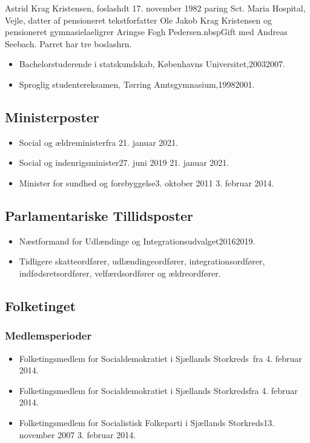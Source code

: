 \documentclass[11pt, a4paper]{awesome-cv}
\begin{document}
\makecvheader[R]
\makelettertitle
\begin{cvletter}
Astrid Krag Kristensen, foslashdt 17. november 1982 paring Sct. Maria Hospital, Vejle, datter af pensioneret tekstforfatter Ole Jakob Krag Kristensen og pensioneret gymnasielaeligrer Aringse Fogh Pedersen.nbspGift med Andreas Seebach. Parret har tre boslashrn.

\begin{itemize}
\item Bachelorstuderende i statskundskab, Københavns Universitet,20032007.
\item Sproglig studentereksamen, Tørring Amtsgymnasium,19982001.
\end{itemize}
\subsection*{Ministerposter}
\begin{itemize}
\item Social og ældreministerfra 21. januar 2021.
\item Social og indenrigsminister27. juni 2019  21. januar 2021.
\item Minister for sundhed og forebyggelse3. oktober 2011  3. februar 2014.
\end{itemize}
\subsection*{Parlamentariske Tillidsposter}
\begin{itemize}
\item Næstformand for Udlændinge og Integrationsudvalget20162019.
\item Tidligere skatteordfører, udlændingeordfører, integrationsordfører, indfødsretsordfører, velfærdsordfører og ældreordfører.
\end{itemize}
\subsection*{Folketinget}
\subsubsection*{Medlemsperioder}
\begin{itemize}
\item Folketingsmedlem for Socialdemokratiet i Sjællands Storkreds fra 4. februar 2014.
\item Folketingsmedlem for Socialdemokratiet i Sjællands Storkredsfra 4. februar 2014.
\item Folketingsmedlem for Socialistisk Folkeparti i Sjællands Storkreds13. november 2007  3. februar 2014.
\end{itemize}

\end{cvletter}
\end{document}
